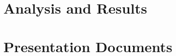 \documentclass[krantz1]{krantz}\usepackage{graphicx, color}
\begin{document}
\part{Analysis and Results}









\part{Presentation Documents}














\clearpage
\printindex
\end{document}
